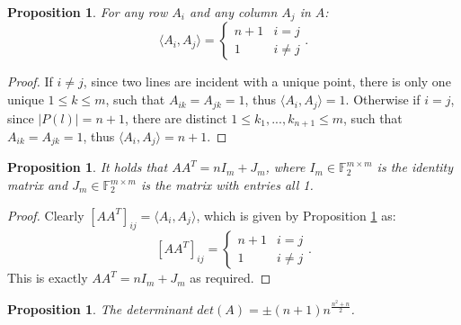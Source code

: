 \documentclass{report}
\newcommand{\F}{\mathbb{F}}
\newtheorem{proposition}[theorem]{Proposition}
\theoremstyle{definition}\newtheorem*{definition}{Definition}
\theoremstyle{definition}\newtheorem*{example}{Example}
\theoremstyle{remark}\newtheorem*{remark}{Remark}
\begin{document}
\begin{proposition}
\label{prop:dotproduct}
For any row $ A_i $ and any column $ A_j $ in $ A $: $$ \langle A_i, A_j \rangle = \begin{cases} n + 1 & i = j \\ 1 & i \ne j \end{cases}. $$
\end{proposition}

\begin{proof}
If $ i \ne j $, since two lines are incident with a unique point, there is only one unique $ 1 \le k \le m $, such that $ A_{ik} = A_{jk} = 1 $, thus $ \langle A_i, A_j \rangle = 1 $. Otherwise if $ i = j $, since $ |P(l)| = n + 1 $, there are distinct $ 1 \le k_1, ..., k_{n + 1} \le m $, such that $ A_{ik} = A_{jk} = 1 $, thus $ \langle A_i, A_j \rangle = n + 1 $.
\end{proof}

\begin{proposition}
\label{prop:aanij}
It holds that $ AA^T = nI_m + J_m $, where $ I_m \in \F_2^{m \times m} $ is the identity matrix and $ J_m \in \F_2^{m \times m} $ is the matrix with entries all 1.
\end{proposition}

\begin{proof}
Clearly $ [AA^T]_{ij} = \langle A_i, A_j \rangle $, which is given by Proposition \ref{prop:dotproduct} as: $$ [AA^T]_{ij} = \begin{cases} n + 1 & i = j \\ 1 & i \ne j \end{cases}. $$ This is exactly $ AA^T = nI_m + J_m $ as required.
\end{proof}

\begin{proposition}
The determinant $ det(A) = \pm (n + 1) n^{\frac{n^2 + n}{2}} $.
\end{proposition}
\end{document}
